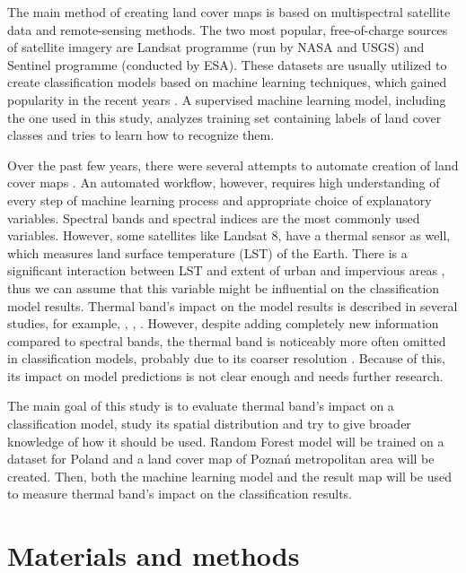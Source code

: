 \documentclass{amuthesis}
\begin{document}
The main method of creating land cover maps is based on multispectral
satellite data and remote-sensing methods. The two most popular,
free-of-charge sources of satellite imagery are Landsat programme (run
by NASA and USGS) and Sentinel programme (conducted by ESA). These
datasets are usually utilized to create classification models based on
machine learning techniques, which gained popularity in the recent years
\autocite{maxwell_implementation_2018}. A supervised machine learning
model, including the one used in this study, analyzes training set
containing labels of land cover classes and tries to learn how to
recognize them.

Over the past few years, there were several attempts to automate
creation of land cover maps
\autocite{malinowski_automated_2020,witjes_spatiotemporal_2021}. An
automated workflow, however, requires high understanding of every step
of machine learning process and appropriate choice of explanatory
variables. Spectral bands and spectral indices are the most commonly
used variables. However, some satellites like Landsat 8, have a thermal
sensor as well, which measures land surface temperature (LST) of the
Earth. There is a significant interaction between LST and extent of
urban and impervious areas \autocite{dutta_changing_2019}, thus we can
assume that this variable might be influential on the classification
model results. Thermal band's impact on the model results is described
in several studies, for example,
\textcite{rodriguez-galiano_incorporating_2012},
\textcite{zhao_exploring_2019}, \textcite{sun_improvement_2015}.
However, despite adding completely new information compared to spectral
bands, the thermal band is noticeably more often omitted in
classification models, probably due to its coarser resolution
\autocite{rodriguez-galiano_incorporating_2012}. Because of this, its
impact on model predictions is not clear enough and needs further
research.

The main goal of this study is to evaluate thermal band's impact on a
classification model, study its spatial distribution and try to give
broader knowledge of how it should be used. Random Forest model will be
trained on a dataset for Poland and a land cover map of Poznań
metropolitan area will be created. Then, both the machine learning model
and the result map will be used to measure thermal band's impact on the
classification results.


\hypertarget{sec-data-methods}{%
\chapter{Materials and methods}\label{sec-data-methods}}
\end{document}
